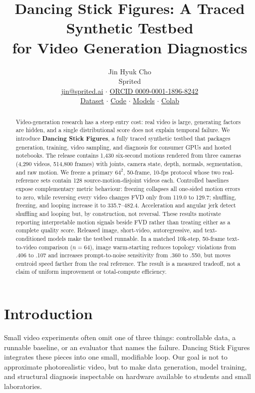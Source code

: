 \documentclass[10pt,twocolumn]{article}
\title{\vspace{-1.5em}\textbf{Dancing Stick Figures: A Traced Synthetic Testbed\\for Video Generation Diagnostics}}
\author{Jin Hyuk Cho\\Sprited\\\small\href{mailto:jin@sprited.ai}{jin@sprited.ai} $\cdot$
\href{https://orcid.org/0009-0001-1896-8242}{ORCID 0009-0001-1896-8242}\\[-2pt]
\small\href{https://huggingface.co/datasets/sprited/dancing-stick-figures}{Dataset} $\cdot$
\href{https://github.com/sprited-ai/dancing-stick-figures}{Code} $\cdot$
\href{https://huggingface.co/sprited/dancing-stick-figures-baselines}{Models} $\cdot$
\href{https://colab.research.google.com/github/sprited-ai/dancing-stick-figures/blob/main/notebooks/dancing_stick_figures_colab.ipynb}{Colab}}
\date{}
\begin{document}
\raggedbottom\maketitle\vspace{-1.25em}
\begin{abstract}
Video-generation research has a steep entry cost: real video is large, generating factors are hidden, and a single
distributional score does not explain temporal failure. We introduce \textbf{Dancing Stick Figures}, a fully traced
synthetic testbed that packages generation, training, video sampling, and diagnosis for consumer GPUs and
hosted notebooks. The release contains 1,430 six-second motions rendered from three cameras (4,290 videos, 514,800
frames) with joints, camera state, depth, normals, segmentation, and raw motion. We freeze a primary $64^2$, 50-frame,
10-fps protocol whose two real-reference sets contain 128 source-motion-disjoint videos each. Controlled baselines
expose complementary metric behaviour: freezing collapses all one-sided motion errors to zero, while reversing every
video changes FVD only from 119.0 to 129.7; shuffling, freezing, and looping increase it to 335.7--482.4. Acceleration
and angular jerk detect shuffling and looping but, by construction, not reversal. These results motivate reporting
interpretable motion signals beside FVD rather than treating either as a complete quality score. Released image,
short-video, autoregressive, and text-conditioned models make the testbed runnable. In a matched 10k-step,
50-frame text-to-video comparison ($n=64$), image warm-starting reduces topology violations from .406 to .107 and
increases prompt-to-noise sensitivity from .360 to .550, but moves centroid speed farther from the real reference.
The result is a measured tradeoff, not a claim of uniform improvement or total-compute efficiency.
\end{abstract}

\section{Introduction}
Small video experiments often omit one of three things: controllable data, a runnable baseline, or an evaluator that
names the failure. Dancing Stick Figures integrates these pieces into one small, modifiable loop. Our goal is not to
approximate photorealistic video, but to make data generation, model training, and structural diagnosis inspectable on
hardware available to students and small laboratories.
\end{document}
